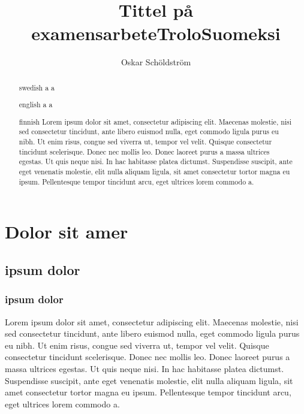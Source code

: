 \documentclass[twoside,emptyfirstpagenumber,swedish]{../thesis}
\begin{document}
\title{Tittel på examensarbete}
\author{Oskar Schöldström}
\date{\the\year}


\maketitle

\begin{abstract}{swedish}
a  a \\
\end{abstract}

\title{Trolo}
\begin{abstract}{english}
a  a \\
\end{abstract}

\title{Suomeksi}
\begin{abstract}{finnish}
Lorem ipsum dolor sit amet, consectetur adipiscing elit. Maecenas molestie, nisi sed consectetur tincidunt, ante libero euismod nulla, eget commodo ligula purus eu nibh. Ut enim risus, congue sed viverra ut, tempor vel velit. Quisque consectetur tincidunt scelerisque. Donec nec mollis leo. Donec laoreet purus a massa ultrices egestas. Ut quis neque nisi. In hac habitasse platea dictumst. Suspendisse suscipit, ante eget venenatis molestie, elit nulla aliquam ligula, sit amet consectetur tortor magna eu ipsum. Pellentesque tempor tincidunt arcu, eget ultrices lorem commodo a.
\end{abstract}

\maketoc

\section{Dolor sit amer}

\subsection{ipsum dolor}

\subsubsection{ipsum dolor}
Lorem ipsum dolor sit amet, consectetur adipiscing elit. Maecenas molestie, nisi sed consectetur tincidunt, ante libero euismod nulla, eget commodo ligula purus eu nibh. Ut enim risus, congue sed viverra ut, tempor vel velit. Quisque consectetur tincidunt scelerisque. Donec nec mollis leo. Donec laoreet purus a massa ultrices egestas. Ut quis neque nisi. In hac habitasse platea dictumst. Suspendisse suscipit, ante eget venenatis molestie, elit nulla aliquam ligula, sit amet consectetur tortor magna eu ipsum. Pellentesque tempor tincidunt arcu, eget ultrices lorem commodo a.
\end{document}
